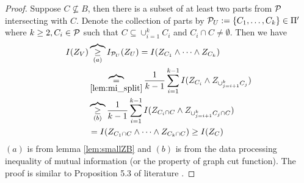 \begin{proof}
\ifshowNonSelf
	Suppose $C \not\subseteq B$, then there is a subset of at least two parts from $\P$ intersecting with $C$. Denote the collection of parts by $\P_U :=\{C_1, \dots, C_k\} \in \Pi'$ where 
	$k \geq 2, C_i \in \P $ such that $C \subseteq \cup_{i=1}^k C_i$ and $C_i \cap C \neq \emptyset$.
	Then we have
\begin{align*}
	I(Z_V) & \overbrace{\geq}_{(a)} I_{\P_U}(Z_U)  = I(Z_{C_1} \wedge \dots \wedge Z_{C_k})\\
	& \overbrace{=}_{\ref{lem:mi_split}} {1\over k-1}\sum_{i=1}^{k-1} I(Z_{C_i} \wedge Z_{\cup_{j=i+1}^k C_j}) \\
	& \overbrace{\geq}_{(b)} \frac{1}{k-1}\sum_{i=1}^{k-1} I(Z_{C_i \cap C} \wedge Z_{\cup_{j=i+1}^k C_j \cap C}) \\
	& = I(Z_{C_1 \cap C} \wedge \dots \wedge Z_{C_k \cap C}) \geq I(Z_C)
\end{align*}
$(a)$ is from lemma \ref{lem:smallZB} and $(b)$ is from the data processing inequality of mutual information (or the property of graph cut function).
\else
The proof is similar to Proposition 5.3 of literature \cite{ska}.
\fi
\end{proof}
